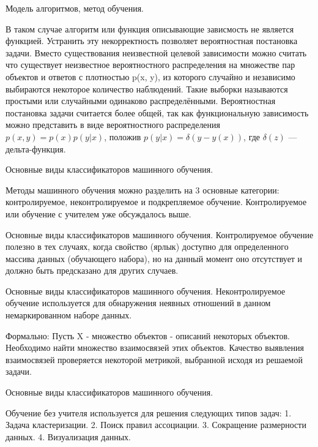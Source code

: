 \documentclass[10pt,pdf,hyperref={unicode}]{beamer}
\begin{document}
\begin{frame}{Модель алгоритмов, метод обучения.}

В таком случае   алгоритм или функция описывающие зависмость  не является функцией.
Устранить эту некорректность позволяет вероятностная постановка задачи.
Вместо существования неизвестной целевой зависимости можно считать что 
существует  неизвестное вероятностного распределения на множестве пар объектов и ответов
с плотностью p(x, y), из которого случайно и независимо выбираются  некоторое количество  наблюдений. 
Такие выборки называются простыми или случайными одинаково распределёнными.
Вероятностная постановка задачи считается более общей, так как функциональную зависимость можно 
представить в виде вероятностного распределения $p(x, y) = p(x)p(y|x)$, положив $p(y|x) = \delta(y − y (x))$, где $\delta(z)$ — дельта-функция.

\end{frame}  



\begin{frame}{Основные виды классификаторов машинного обучения.}

Методы машинного обучения можно разделить на 3 основные категории: контролируемое, 
неконтролируемое и подкрепляемое обучение. Контролируемое или обучение с учителем  уже обсуждалось выше.

\end{frame}


\begin{frame}{Основные виды классификаторов машинного обучения.}
Контролируемое обучение полезно в тех случаях, когда свойство (ярлык) доступно для определенного массива данных (обучающего набора), но на данный момент оно отсутствует и должно быть предсказано для других случаев. 
\end{frame}


\begin{frame}{Основные виды классификаторов машинного обучения.}
Неконтролируемое обучение используется для обнаружения неявных отношений в данном немаркированном наборе данных. 

Формально:
Пусть X - множество объектов  - описаний некоторых
объектов. Необходимо найти множество  взаимосвязей этих объектов.
Качество выявления взаимосвязей проверяется некоторой метрикой,
выбранной исходя из решаемой задачи.

\end{frame}


\begin{frame}{Основные виды классификаторов машинного обучения.}


Обучение без учителя используется для решения следующих
типов задач:
1. Задача кластеризации.
2. Поиск правил ассоциации.
3. Сокращение размерности данных.
4. Визуализация данных.

\end{frame}
\end{document}
